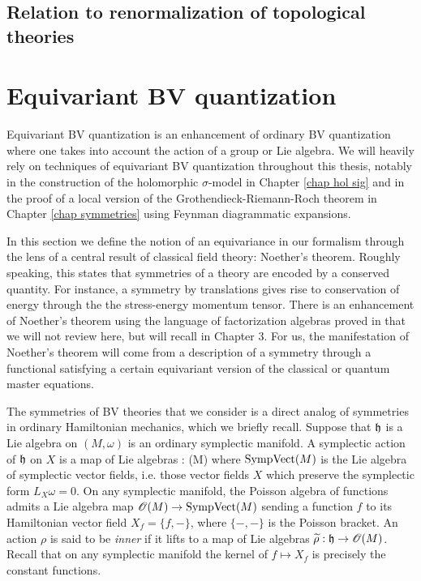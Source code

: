 \subsection{Relation to renormalization of topological theories}


\section{Equivariant BV quantization}

Equivariant BV quantization is an enhancement of ordinary BV quantization where one takes into account the action of a group or Lie algebra. 
We will heavily rely on techniques of equivariant BV quantization throughout this thesis, notably in the construction of the holomorphic $\sigma$-model in Chapter \ref{chap hol sig} and in the proof of a local version of the Grothendieck-Riemann-Roch theorem in Chapter \ref{chap symmetries} using Feynman diagrammatic expansions.

In this section we define the notion of an equivariance in our formalism through the lens of a central result of classical field theory: Noether's theorem.
Roughly speaking, this states that symmetries of a theory are encoded by a conserved quantity. 
For instance, a symmetry by translations gives rise to conservation of energy through the the stress-energy momentum tensor. 
There is an enhancement of Noether's theorem using the language of factorization algebras proved in \cite{CG2} that we will not review here, but will recall in Chapter 3. 
For us, the manifestation of Noether's theorem will come from a description of a symmetry through a functional satisfying a certain equivariant version of the classical or quantum master equations. 

The symmetries of BV theories that we consider is a direct analog of symmetries in ordinary Hamiltonian mechanics, which we briefly recall. 
Suppose that $\mathfrak h$ is a Lie algebra on $(M,\omega)$ is an ordinary symplectic manifold. 
A symplectic action of $\mathfrak h$ on $X$ is a map of Lie algebras 
\ben
\rho : \fh {}(M)
\een
where ${\rm SympVect}(M)$ is the Lie algebra of symplectic vector fields, i.e. those vector fields $X$ which preserve the symplectic form $L_X \omega = 0$.
On any symplectic manifold, the Poisson algebra of functions admits a Lie algebra map $\mathscr O(M) \to {\rm SympVect}(M)$ sending a function $f$ to its Hamiltonian vector field $X_f = \{f,-\}$, where $\{-,-\}$ is the Poisson bracket.
An action $\rho$ is said to be {\em inner} if it lifts to a map of Lie algebras $\widetilde{\rho} : \mathfrak h \to \mathscr O(M)$. 
Recall that on any symplectic manifold the kernel of $f \mapsto X_f$ is precisely the constant functions. 


